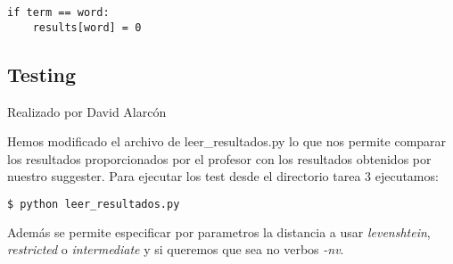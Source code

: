 \begin{lstlisting}[caption=Condición 3]
if term == word:
    results[word] = 0
\end{lstlisting}

\subsection{Testing}
{\color{red}Realizado por David Alarcón}

Hemos modificado el archivo de leer{\_}resultados.py lo que nos permite comparar los resultados proporcionados por el profesor con los resultados obtenidos por nuestro suggester.
\newpage
Para ejecutar los test desde el directorio tarea 3 ejecutamos:

\begin{lstlisting}[language=bash]
    $ python leer_resultados.py
\end{lstlisting}

Además se permite especificar por parametros la distancia a usar \emph{levenshtein}, \emph{restricted} o \emph{intermediate} y si queremos que sea no verbos \emph{-nv}.

\newpage 